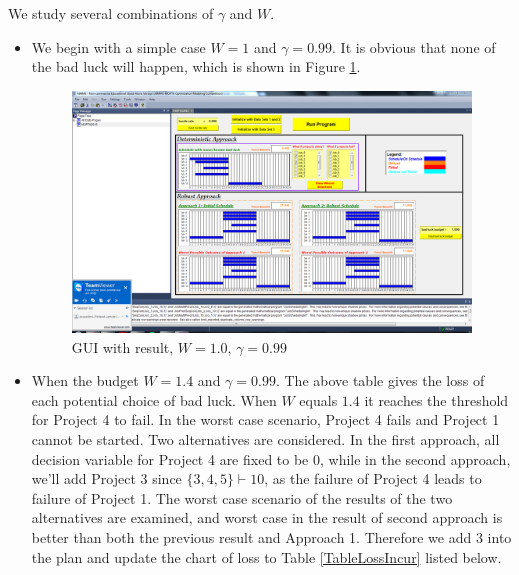 \documentclass[final,3p,times]{elsarticle}
\begin{document}
We study several combinations of $\gamma$ and $W$. 
\begin{itemize}
	\item We begin with a simple case $W=1$ and $\gamma=0.99$. It is obvious that none of the bad luck will happen, which is shown in Figure \ref{FigData1hp990w1p000}.
	
		\begin{figure}[H]
			\centering
			\includegraphics[trim=110mm 40mm 5mm 25mm, clip, width=14cm]{Data1hp990w1p000.png}
			\caption{GUI with result, $W=1.0$, $\gamma=0.99$}
			\label{FigData1hp990w1p000}
		\end{figure}
	
	\item When the budget $W=1.4$ and $\gamma=0.99$. The above table gives the loss of each potential choice of bad luck. When $W$ equals $1.4$ it reaches the threshold for Project 4 to fail. In the worst case scenario, Project 4 fails and Project 1 cannot be started. Two alternatives are considered. In the first approach, all decision variable for Project 4 are fixed to be 0, while in the second approach, we'll add Project 3 since $\{3,4,5\}\vdash 10$, as the failure of Project 4 leads to failure of Project 1. The worst case scenario of the results of the two alternatives are examined, and worst case in the result of second approach is better than both the previous result and Approach 1. Therefore we add 3 into the plan and update the chart of loss to Table \ref{TableLossIncur} listed below.


\end{itemize}
\end{document}
